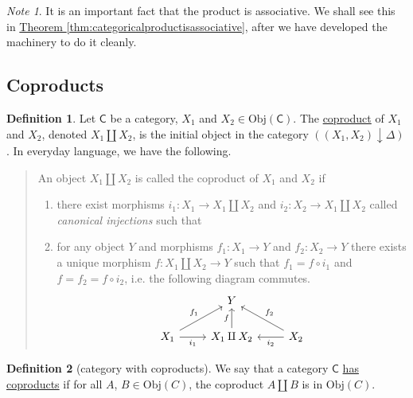 \documentclass[a4paper,10pt]{scrreprt}
\newcommand{\defn}[1]{\ul{#1}}
\newcommand{\Obj}{\mathrm{Obj}}
\theoremstyle{definition}
\newtheorem{definition}{Definition}[section]
\theoremstyle{plain}
\theoremstyle{remark}
\newtheorem{note}{Note}[section]
\begin{document}
\begin{note}
  It is an important fact that the product is associative. We shall see this in \hyperref[thm:categoricalproductisassociative]{Theorem \ref*{thm:categoricalproductisassociative}}, after we have developed the machinery to do it cleanly.
\end{note}

\subsection{Coproducts}
\begin{definition}
  Let $\mathsf{C}$ be a category, $X_{1}$ and $X_{2} \in \Obj(\mathsf{C})$. The \defn{coproduct} of $X_{1}$ and $X_{2}$, denoted $X_{1} \amalg X_{2}$, is the initial object in the category $((X_{1},X_{2})\downarrow \Delta)$. In everyday language, we have the following.
  \begin{quote}
    An object $X_{1} \amalg X_{2}$ is called the coproduct of $X_{1}$ and $X_{2}$ if 
    \begin{enumerate}
      \item there exist morphisms $i_{1}\colon X_{1} \to X_{1} \amalg X_{2}$ and $i_{2}\colon X_{2} \to X_{1} \amalg X_{2}$ called \emph{canonical injections} such that

      \item for any object $Y$ and morphisms $f_{1}\colon X_{1} \to Y$ and $f_{2}\colon X_{2} \to Y$ there exists a unique morphism $f\colon X_{1} \amalg X_{2} \to Y$ such that $f_{1} = f \circ i_{1}$ and $f = f_{2} = f \circ i_{2}$, i.e. the following diagram commutes.
        \begin{equation*}
          \begin{tikzcd}
            & Y & \\
            X_{1} \arrow[ur, "f_{1}"] \arrow[r, swap, "i_{1}"] & X_{1} \arrow[u, "f"] \amalg X_{2} & X_{2} \arrow[l, "i_{2}"] \arrow[ul, swap, "f_{2}"]
          \end{tikzcd}
        \end{equation*}
    \end{enumerate}
  \end{quote}
\end{definition}

\begin{definition}[category with coproducts]
  \label{def:categorywithcoproducts}
  We say that a category $\mathsf{C}$ \defn{has coproducts} if for all $A$, $B \in \Obj(C)$, the coproduct $A \amalg B$ is in $\Obj(C)$.
\end{definition} 
\end{document}
